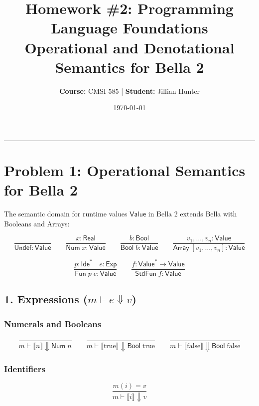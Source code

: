 \documentclass[11pt,a4paper]{article}
\title{\textbf{Homework \#2: Programming Language Foundations}\\ \Large Operational and Denotational Semantics for Bella 2}
\author{\textbf{Course:} CMSI 585 \quad | \quad \textbf{Student:} Jillian Hunter}
\date{\today}
\begin{document}
\maketitle

\hrule
\vspace{1.5em}

\section*{Problem 1: Operational Semantics for Bella 2}

The semantic domain for runtime values $\mathsf{Value}$ in Bella 2 extends Bella with Booleans and Arrays:

\begin{equation*}
\frac{}{\mathsf{Undef} : \mathsf{Value}}
\qquad
\frac{x : \mathsf{Real}}{\mathsf{Num}\;x : \mathsf{Value}}
\qquad
\frac{b : \mathsf{Bool}}{\mathsf{Bool}\;b : \mathsf{Value}}
\qquad
\frac{v_1,\ldots,v_n : \mathsf{Value}}{\mathsf{Array}\;[v_1,\ldots,v_n] : \mathsf{Value}}
\end{equation*}

\begin{equation*}
\frac{p : \mathsf{Ide}^* \quad e : \mathsf{Exp}}{\mathsf{Fun}\;p\;e : \mathsf{Value}}
\qquad
\frac{f : \mathsf{Value}^* \to \mathsf{Value}}{\mathsf{StdFun}\;f : \mathsf{Value}}
\end{equation*}

\subsection*{1. Expressions ($m \vdash e \Downarrow v$)}

\subsubsection*{Numerals and Booleans}
\begin{equation*}
\frac{}{m \vdash \llbracket n \rrbracket \Downarrow \mathsf{Num}\;n}
\qquad
\frac{}{m \vdash \llbracket \text{true} \rrbracket \Downarrow \mathsf{Bool}\;\text{true}}
\qquad
\frac{}{m \vdash \llbracket \text{false} \rrbracket \Downarrow \mathsf{Bool}\;\text{false}}
\end{equation*}

\subsubsection*{Identifiers}
\begin{equation*}
\frac{m(i) = v}{m \vdash \llbracket i \rrbracket \Downarrow v}
\end{equation*}
\end{document}
